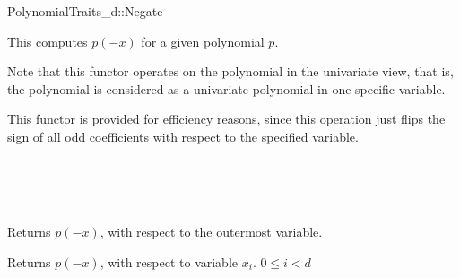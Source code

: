 \begin{ccRefConcept}{PolynomialTraits_d::Negate}
\ccDefinition

This  computes $p(-x)$ for a given polynomial $p$. 

Note that this functor operates on the polynomial in the univariate view, that is, 
the polynomial is considered as a univariate polynomial in one specific variable. 

This functor is provided for efficiency reasons, since this operation just flips the sign 
of all odd coefficients with respect to the specified variable.  

\ccRefines 
{}\\
\\
\\

\ccTypes
{}
\ccGlue
{}

\ccOperations
{}
         { Returns $p(-x)$, with respect to the outermost variable. }

         { Returns $p(-x)$, with respect to variable $x_i$. 
           \ccPrecond $0 \leq i  < d$
         }


\ccSeeAlso

\\
\\

\end{ccRefConcept}
